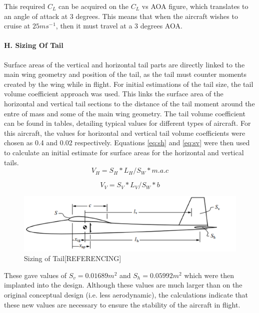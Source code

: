 \documentclass[12pt]{article}
\begin{document}
\noindent This required $C{_L}$ can be acquired on the $C{_L}$  vs AOA figure, which translates to an angle of attack at 3 degrees. This means that when the aircraft wishes to cruise at $25ms{{^-}^1}$, then it must travel at a 3 degrees AOA. \\

\paragraph{H. Sizing Of Tail} Surface areas of the vertical and horizontal tail parts are directly linked to the main wing geometry and position of the tail, as the tail must counter moments created by the wing while in flight. For initial estimations of the tail size, the tail volume coefficient approach was used. This links the surface area of the horizontal and vertical tail sections to the distance of the tail moment around the entre of mass and some of the main wing geometry. The tail volume coefficient can be found in tables, detailing typical values for different types of aircraft. For this aircraft, the values for horizontal and vertical tail volume coefficients were chosen as 0.4 and 0.02 respectively. Equations \ref{eq:sh} and \ref{eq:sv} were then used to calculate an initial estimate for surface areas for the horizontal and vertical tails. \\

\begin{equation} \label{eq:sh}
V_H = S_H * L_H/S_W * m.a.c
\end{equation}

\begin{equation} \label{eq:sv}
V_V = S_V * L_V/S_W * b
\end{equation}

\begin{figure}[H]
    \includegraphics[width=18cm, scale=1]{tailsize.png}
    \centering
    \caption{Sizing of Tail[REFERENCING]}
    \label{fig:tailsize}
\end{figure}
    
\noindent These gave values of $S{_v}=0.01689m{^2}$ and $S{_h}=0.05992m{^2}$ which were then implanted into the design. Although these values are much larger than on the original conceptual design (i.e. less aerodynamic), the calculations indicate that these new values are necessary to ensure the stability of the aircraft in flight. \\
\end{document}
